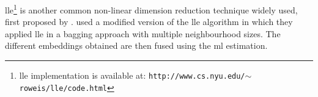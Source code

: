 \ac{lle}\footnote{\ac{lle} implementation is available at: \texttt{http://www.cs.nyu.edu/\allowbreak $\sim$roweis/lle/code.html}} is another common non-linear dimension reduction technique widely used, first proposed by \cite{Roweis2000}. %
%
%
%
%
%
%
%
\cite{Tiwari2008} used a modified version of the \ac{lle} algorithm in which they applied \ac{lle} in a bagging approach with multiple neighbourhood sizes. The different embeddings obtained are then fused using the \ac{ml} estimation.